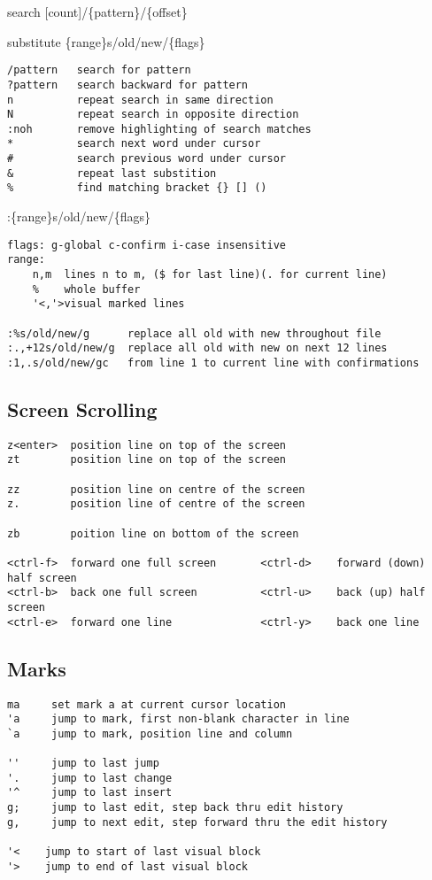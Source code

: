 \documentclass{article}
\begin{document}
search {[}count{]}/\{pattern\}/\{offset\}

substitute \{range\}s/old/new/\{flags\}

\begin{verbatim}
/pattern   search for pattern
?pattern   search backward for pattern
n          repeat search in same direction
N          repeat search in opposite direction
:noh       remove highlighting of search matches
*          search next word under cursor
#          search previous word under cursor
&          repeat last substition
%          find matching bracket {} [] ()
\end{verbatim}

:\{range\}s/old/new/\{flags\}

\begin{verbatim}
flags: g-global c-confirm i-case insensitive
range:
    n,m  lines n to m, ($ for last line)(. for current line)
    %    whole buffer
    '<,'>visual marked lines

:%s/old/new/g      replace all old with new throughout file
:.,+12s/old/new/g  replace all old with new on next 12 lines
:1,.s/old/new/gc   from line 1 to current line with confirmations
\end{verbatim}

\newpage

\subsection{Screen Scrolling}\label{screen-scrolling}

\begin{verbatim}
z<enter>  position line on top of the screen
zt        position line on top of the screen

zz        position line on centre of the screen
z.        position line of centre of the screen

zb        poition line on bottom of the screen

<ctrl-f>  forward one full screen       <ctrl-d>    forward (down) half screen
<ctrl-b>  back one full screen          <ctrl-u>    back (up) half screen
<ctrl-e>  forward one line              <ctrl-y>    back one line
\end{verbatim}

\subsection{Marks}\label{marks}

\begin{verbatim}
ma     set mark a at current cursor location
'a     jump to mark, first non-blank character in line
`a     jump to mark, position line and column

''     jump to last jump
'.     jump to last change
'^     jump to last insert
g;     jump to last edit, step back thru edit history
g,     jump to next edit, step forward thru the edit history

'<    jump to start of last visual block
'>    jump to end of last visual block
\end{verbatim}
\end{document}
